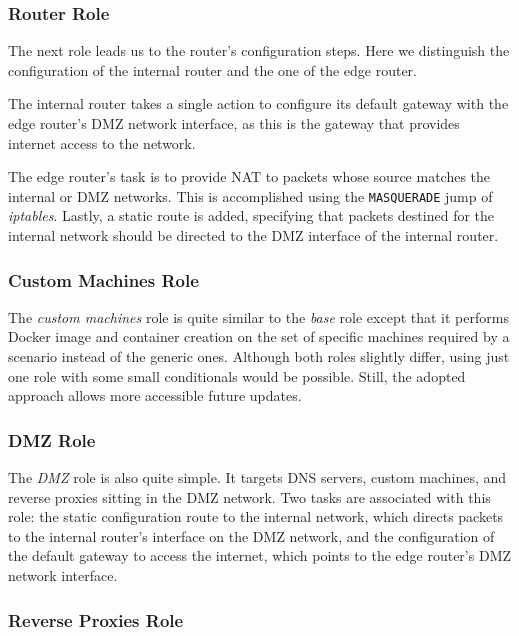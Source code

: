 \subsubsection{Router Role} \label{sec:ansible_router_role}

The next role leads us to the router's configuration steps. Here we distinguish the configuration of the internal router and the one of the edge router. 

The internal router takes a single action to configure its default gateway with the edge router's DMZ network interface, as this is the gateway that provides internet access to the network.

The edge router's task is to provide NAT to packets whose source matches the internal or DMZ networks. This is accomplished using the \texttt{MASQUERADE} jump of \textit{iptables}. Lastly, a static route is added, specifying that packets destined for the internal network should be directed to the DMZ interface of the internal router.

\subsubsection{Custom Machines Role} \label{sec:ansible_custom_machines_role}

The \textit{custom machines} role is quite similar to the \textit{base} role except that it performs Docker image and container creation on the set of specific machines required by a scenario instead of the generic ones. Although both roles slightly differ, using just one role with some small conditionals would be possible. Still, the adopted approach allows more accessible future updates.

\subsubsection{DMZ Role} \label{sec:ansible_dmz_role}

The \textit{DMZ} role is also quite simple. It targets DNS servers, custom machines, and reverse proxies sitting in the DMZ network. Two tasks are associated with this role: the static configuration route to the internal network, which directs packets to the internal router's interface on the DMZ network, and the configuration of the default gateway to access the internet, which points to the edge router's DMZ network interface.

\subsubsection{Reverse Proxies Role} \label{sec:ansible_reverse_proxies_role}

